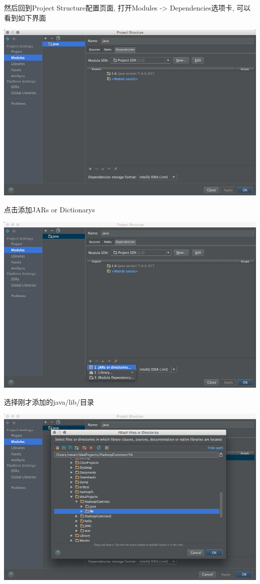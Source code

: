 然后回到Project Structure配置页面, 打开Modules -> Dependencies选项卡, 可以看到如下界面

\includegraphics[width=\textwidth]{image/env/cr27.png}

点击添加JARs or Dictionarys

\includegraphics[width=\textwidth]{image/env/cr28.png}

选择刚才添加的java/lib/目录

\includegraphics[width=\textwidth]{image/env/cr29.png}

